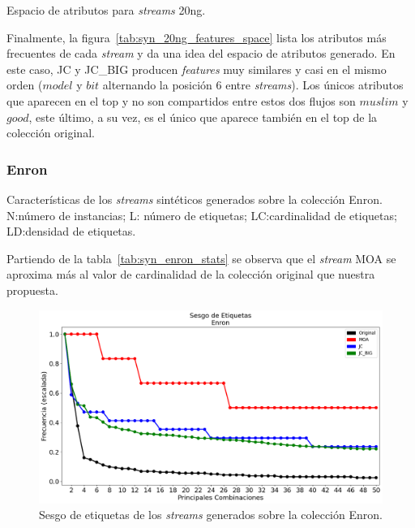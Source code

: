\begin{table}[htbp]
	\centering
	\begin{adjustbox}{max width=\textwidth}
		
	\end{adjustbox}
	\caption{Espacio de atributos para \textit{streams} 20ng.}
	\label{tab:syn_20ng_features_space}
\end{table}

Finalmente, la figura~\ref{tab:syn_20ng_features_space} lista los atributos más
frecuentes de cada \textit{stream} y da una idea del espacio de atributos
generado. En este caso, JC y JC\_BIG producen \textit{features} muy similares y
casi en el mismo orden ($model$ y $bit$ alternando la posición 6 entre
\textit{streams}). Los únicos atributos que aparecen en el top y no son
compartidos entre estos dos flujos son $muslim$ y $good$, este último, a su vez,
es el único que aparece también en el top de la colección original.

\subsubsection{Enron}

\bigskip
\bigskip
\begin{table}[htbp]
	\centering
	\begin{adjustbox}{max width=\textwidth}
		
	\end{adjustbox}
	\caption[Características de los \textit{streams} sintéticos generados sobre
		la colección Enron.]{Características de los \textit{streams} sintéticos
		generados sobre la colección Enron.  N:\@ número de instancias; L:\@
		número de etiquetas; LC:\@ cardinalidad de etiquetas; LD:\@ densidad de
		etiquetas.}
	\label{tab:syn_enron_stats}
\end{table}

\bigskip
\bigskip

Partiendo de la tabla~\ref{tab:syn_enron_stats} se observa que el
\textit{stream} MOA se aproxima más al valor de cardinalidad de la colección
original que nuestra propuesta.

\bigskip

\begin{figure}
	\includegraphics[width=\linewidth]{figures/experiments/syn/enron/label_skew.png}
	\caption{Sesgo de etiquetas de los \textit{streams} generados sobre la colección
		Enron.} \label{fig:syn_enron_label_skew}
\end{figure}

